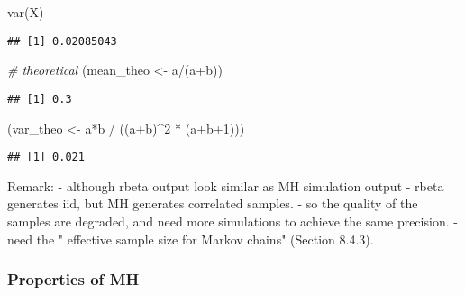 \documentclass[
]{article}
\newenvironment{Shaded}{\begin{snugshade}}{\end{snugshade}}
\newcommand{\CommentTok}[1]{\textcolor[rgb]{0.56,0.35,0.01}{\textit{#1}}}
\newcommand{\DecValTok}[1]{\textcolor[rgb]{0.00,0.00,0.81}{#1}}
\newcommand{\FunctionTok}[1]{\textcolor[rgb]{0.00,0.00,0.00}{#1}}
\newcommand{\NormalTok}[1]{#1}
\newcommand{\OtherTok}[1]{\textcolor[rgb]{0.56,0.35,0.01}{#1}}
\newcommand{\SpecialCharTok}[1]{\textcolor[rgb]{0.00,0.00,0.00}{#1}}
\begin{document}
\begin{Shaded}
\begin{Highlighting}[]
\FunctionTok{var}\NormalTok{(X)}
\end{Highlighting}
\end{Shaded}

\begin{verbatim}
## [1] 0.02085043
\end{verbatim}

\begin{Shaded}
\begin{Highlighting}[]
\CommentTok{\# theoretical }
\NormalTok{(mean\_theo }\OtherTok{\textless{}{-}}\NormalTok{ a}\SpecialCharTok{/}\NormalTok{(a}\SpecialCharTok{+}\NormalTok{b))}
\end{Highlighting}
\end{Shaded}

\begin{verbatim}
## [1] 0.3
\end{verbatim}

\begin{Shaded}
\begin{Highlighting}[]
\NormalTok{(var\_theo }\OtherTok{\textless{}{-}}\NormalTok{ a}\SpecialCharTok{*}\NormalTok{b }\SpecialCharTok{/}\NormalTok{ ((a}\SpecialCharTok{+}\NormalTok{b)}\SpecialCharTok{\^{}}\DecValTok{2} \SpecialCharTok{*}\NormalTok{ (a}\SpecialCharTok{+}\NormalTok{b}\SpecialCharTok{+}\DecValTok{1}\NormalTok{)))}
\end{Highlighting}
\end{Shaded}

\begin{verbatim}
## [1] 0.021
\end{verbatim}

Remark: - although rbeta output look similar as MH simulation output -
rbeta generates iid, but MH generates correlated samples. - so the
quality of the samples are degraded, and need more simulations to
achieve the same precision. - need the " effective sample size for
Markov chains" (Section 8.4.3).

\hypertarget{properties-of-mh}{%
\subsubsection{Properties of MH}\label{properties-of-mh}}
\end{document}
